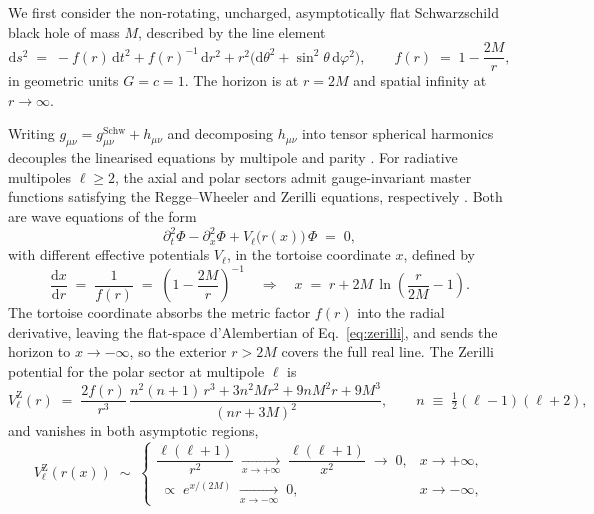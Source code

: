 \documentclass[11pt,a4paper]{article}
\theoremstyle{definition}
\begin{document}
We first consider the non-rotating, uncharged, asymptotically
flat Schwarzschild black hole of mass $M$, described by the
line element
\begin{equation}
  \mathrm{d}s^{2} \;=\;
  -f(r)\,\mathrm{d}t^{2}
  + f(r)^{-1}\,\mathrm{d}r^{2}
  + r^{2}\bigl(\mathrm{d}\theta^{2}
              + \sin^{2}\!\theta\,\mathrm{d}\varphi^{2}\bigr),
  \qquad f(r) \;=\; 1 - \frac{2M}{r},
  \label{eq:schwarzschild}
\end{equation}
in geometric units $G = c = 1$. The horizon is at $r = 2M$ and
spatial infinity at $r \to \infty$.

Writing
$g_{\mu\nu}=g_{\mu\nu}^{\mathrm{Schw}}+h_{\mu\nu}$ and
decomposing $h_{\mu\nu}$ into tensor spherical harmonics
decouples the linearised equations by multipole and parity
\citep{ReggeWheeler1957,Zerilli1970,Moncrief1974,
MartelPoisson2005}. For radiative multipoles $\ell\ge2$, the
axial and polar sectors admit gauge-invariant master functions
satisfying the Regge--Wheeler and Zerilli equations,
respectively \citep{Chandrasekhar1975,MartelPoisson2005}. Both
are wave equations of the form
\begin{equation}
  \partial_{t}^{2}\Phi
  - \partial_{x}^{2}\Phi
  + V_{\ell}\bigl(r(x)\bigr)\,\Phi \;=\; 0,
  \label{eq:zerilli}
\end{equation}
with different effective potentials $V_{\ell}$, in the tortoise
coordinate $x$, defined by
\begin{equation}
  \frac{\mathrm{d}x}{\mathrm{d}r} \;=\; \frac{1}{f(r)}
  \;=\; \left(1 - \frac{2M}{r}\right)^{-1}
  \quad\Longrightarrow\quad
  x \;=\; r + 2M\,\ln\!\left(\frac{r}{2M} - 1\right).
  \label{eq:tortoise}
\end{equation}
The tortoise coordinate absorbs the metric factor $f(r)$ into
the radial derivative, leaving the flat-space d'Alembertian of
Eq.~\eqref{eq:zerilli}, and sends the horizon to
$x \to -\infty$, so the exterior $r > 2M$ covers the full real
line. The Zerilli potential for the polar sector
at multipole $\ell$ is
\begin{equation}
  V_{\ell}^{\mathrm{Z}}(r) \;=\;
  \frac{2 f(r)}{r^{3}}\,
  \frac{n^{2}(n+1)\,r^{3} + 3 n^{2} M r^{2}
        + 9 n M^{2} r + 9 M^{3}}{(n r + 3 M)^{2}},
  \qquad n \;\equiv\; \tfrac{1}{2}(\ell - 1)(\ell + 2),
  \label{eq:V-zerilli}
\end{equation}
and vanishes in both asymptotic regions,
\begin{equation}
  V_{\ell}^{\mathrm{Z}}(r(x)) \;\sim\;
  \begin{cases}
    \dfrac{\ell(\ell+1)}{r^{2}}
      \;\xrightarrow[x\to+\infty]{}\; \dfrac{\ell(\ell+1)}{x^{2}} \;\to\; 0,
      & x \to +\infty,\\[2pt]
    \;\propto\; e^{x/(2M)}
      \;\xrightarrow[x\to-\infty]{}\; 0,
      & x \to -\infty,
  \end{cases}
  \label{eq:V-asymptotic}
\end{equation}
\end{document}
